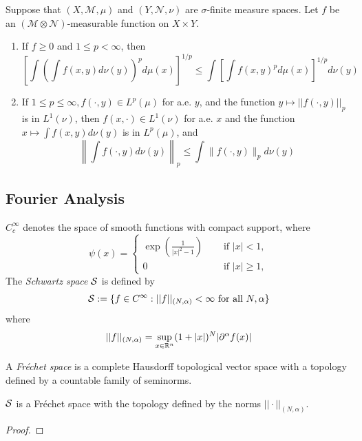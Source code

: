 \begin{theorem}\par
    Suppose that $(X,\mathcal{M},\mu)$ and $(Y,\mathcal{N},\nu)$ are $\sigma$-finite measure spaces. Let $f$ be an $(\mathcal{M}\otimes\mathcal{N})$-measurable function on $X\times Y$.
    \begin{enumerate}
        \item If $f\geq 0$ and $1\leq p <\infty$, then
        \[
        \left[\int\left(\int f(x,y)d\nu(y)\right)^p d\mu(x)\right]^{1/p} \leq \int \left[\int f(x,y)^p d\mu(x)\right]^{1/p}d\nu(y)
        \]
        \item If $1\leq p \leq \infty, f(\cdot,y) \in L^p(\mu)$ for a.e. $y$, and the function $y\mapsto ||f(\cdot,y)||_p$ is in $L^1(\nu)$, then $f(x,\cdot)\in L^1(\nu)$ for a.e. $x$ and the function $x\mapsto \int f(x,y)d\nu(y)$ is in $L^p(\mu)$, and
        \[
        \left\lVert \int f(\cdot,y)d\nu(y)\right\rVert_p \leq \int \lVert f(\cdot,y)\rVert_p d\nu(y)
        \]
    \end{enumerate}
\end{theorem}

\subsection{Fourier Analysis}

\begin{definition}
    $C^{\infty}_c$ denotes the space of smooth functions with compact support, where
    \[\psi(x) = \begin{cases}
    \exp\left( \tfrac{1}{|x|^2-1}\right)\quad&\text{ if }|x|<1, \\
    0&\text{ if }|x|\geq 1,
    \end{cases}
    \] 
    The \emph{Schwartz space} $\mathcal{S}$ is defined by
    \[
    \mathcal{S} := \{f\in C^{\infty}:||f||_{(N,\alpha)}<\infty\text{ for all }N,\alpha\}
    \]
    where
    \[
    ||f||_{(N,\alpha)} = \sup_{x\in\mathbb{R}^n}(1+|x|)^N|\partial^{\alpha}f(x)|
    \]
\end{definition}

\begin{definition}\par
A \emph{Fr\'echet space} is a complete Hausdorff topological vector space with a topology defined by a countable family of seminorms.
\end{definition}

\begin{proposition}
    $\mathcal{S}$ is a Fr\'echet space with the topology defined by the norms $||\cdot||_{(N,\alpha)}$.
\end{proposition}
\begin{proof}
    
\end{proof}

